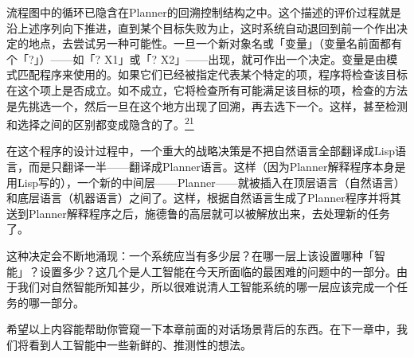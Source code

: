 \documentclass[
  12pt,
  twoside,
  openright,
  oldfontcommands,
]{memoir}
\newenvironment{fsquote}{%
  \begin{mdframed}[style=gebquote]\kaitifamily\small%
}{%
  \end{mdframed}%
}
\begin{document}
\begin{fsquote}
流程图中的循环已隐含在Planner的回溯控制结构之中。这个描述的评价过程就是沿上述序列向下推进，直到某个目标失败为止，这时系统自动退回到前一个作出决定的地点，去尝试另一种可能性。一旦一个新对象名或「变量」（变量名前面都有个「?」）------如「? X1」或「?
X2」------出现，就可作出一个决定。变量是由模式匹配程序来使用的。如果它们已经被指定代表某个特定的项，程序将检查该目标在这个项上是否成立。如不成立，它将检查所有可能满足该目标的项，检查的方法是先挑选一个，然后一旦在这个地方出现了回溯，再去选下一个。这样，甚至检测和选择之间的区别都变成隐含的了。\hyperref[fn:Chapter18-21]{\textsuperscript{21}}
\end{fsquote}

在这个程序的设计过程中，一个重大的战略决策是不把自然语言全部翻译成Lisp语言，而是只翻译一半------翻译成Planner语言。这样（因为Planner解释程序本身是用Lisp写的），一个新的中间层------Planner------就被插入在顶层语言（自然语言）和底层语言（机器语言）之间了。这样，根据自然语言生成了Planner程序并将其送到Planner解释程序之后，施德鲁的高层就可以被解放出来，去处理新的任务了。

这种决定会不断地涌现：一个系统应当有多少层？在哪一层上该设置哪种「智能」？设置多少？这几个是人工智能在今天所面临的最困难的问题中的一部分。由于我们对自然智能所知甚少，所以很难说清人工智能系统的哪一层应该完成一个任务的哪一部分。

希望以上内容能帮助你管窥一下本章前面的对话场景背后的东西。在下一章中，我们将看到人工智能中一些新鲜的、推测性的想法。
\end{document}
